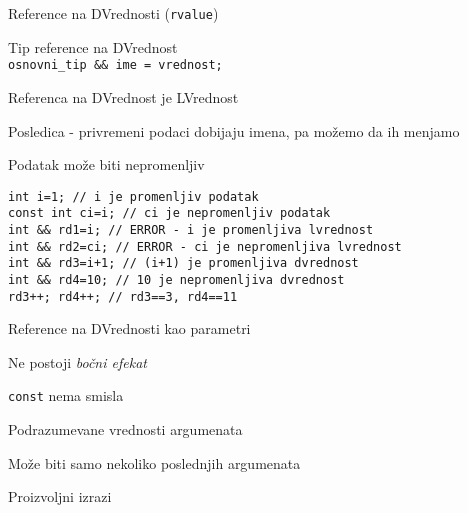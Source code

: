 \documentclass{article}
\newenvironment{xitemize}{%
    
    \itemize
    \larger
}{%
    \enditemize
}
\let\olditemize\itemize
\let\endolditemize\enditemize
\renewenvironment{itemize}{%
    \smaller
    \olditemize
}{%
    \endolditemize
}
\providecommand{\inlinecode}[1]{\texttt{#1}}
\begin{document}
\begin{xitemize}
\begin{itemize}
\end{itemize}
\begin{multicols}{2}
\item Reference na DVrednosti (\inlinecode {rvalue})
\begin{itemize}
    \item Tip reference na DVrednost\\
    \inlinecode{osnovni\_tip \&\& ime = vrednost;}
    \item Referenca na DVrednost je LVrednost
    \item Posledica - privremeni podaci dobijaju imena, pa možemo da ih menjamo
    \item Podatak može biti nepromenljiv
\end{itemize}
\columnbreak
\begin{lstlisting}
int i=1; // i je promenljiv podatak
const int ci=i; // ci je nepromenljiv podatak
int && rd1=i; // ERROR - i je promenljiva lvrednost
int && rd2=ci; // ERROR - ci je nepromenljiva lvrednost
int && rd3=i+1; // (i+1) je promenljiva dvrednost
int && rd4=10; // 10 je nepromenljiva dvrednost 
rd3++; rd4++; // rd3==3, rd4==11 
\end{lstlisting}
\end{multicols}
\item Reference na DVrednosti kao parametri
\begin{itemize}
    \item Ne postoji \textit{bočni efekat}
    \item \inlinecode {const} nema smisla
\end{itemize}
\item Podrazumevane vrednosti argumenata
\begin{itemize}
    \item Može biti samo nekoliko poslednjih argumenata
    \item Proizvoljni izrazi
\end{itemize}
\newpage


\end{xitemize}
\end{document}

